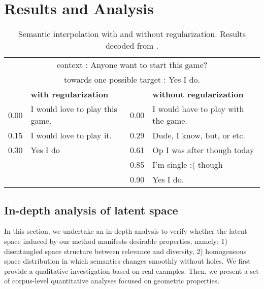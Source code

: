 \documentclass[11pt,a4paper]{article}
\begin{document}
\section{Results and Analysis}
\begin{table*}[!ht]
    \centering
    \small
    \begin{tabular}{p{} p{}|p{} p{}}  
    
    \hline
    
    \multicolumn{4}{c}{context : Anyone want to start this game?}\\
    
    \multicolumn{4}{c}{towards one possible target : Yes I do.} \\ 
    \hline
       & \textbf{with regularization}             &     & \textbf{without regularization} \\ \hline
    0.00  & I would love to play this game.  & 0.00   & I would have to play with the game. \\
    0.15  & I would love to play it.         & 0.29   & Dude, I know, but, or etc.  \\
    0.30  & Yes I do                         & 0.61   & Op I was after though today\\
          &                                  & 0.85   & I'm single :( though \\
          &                                  & 0.90   & Yes I do. \\
    \hline
    
    
    \end{tabular}
    \caption{Semantic interpolation with and without regularization. Results decoded from  
    .}
    \label{table:interp}
\end{table*}
 
\subsection{In-depth analysis of latent space}

\label{sec:vis}
In this section, we undertake an in-depth analysis to verify whether the latent space induced by our method manifests desirable properties, namely: 1) disentangled space structure between relevance and diversity, 2) homogeneous space distribution in which semantics changes smoothly without holes.
We first provide a qualitative investigation based on real examples. Then, we present a set of corpus-level quantitative analyses focused on  geometric properties. 
\end{document}
